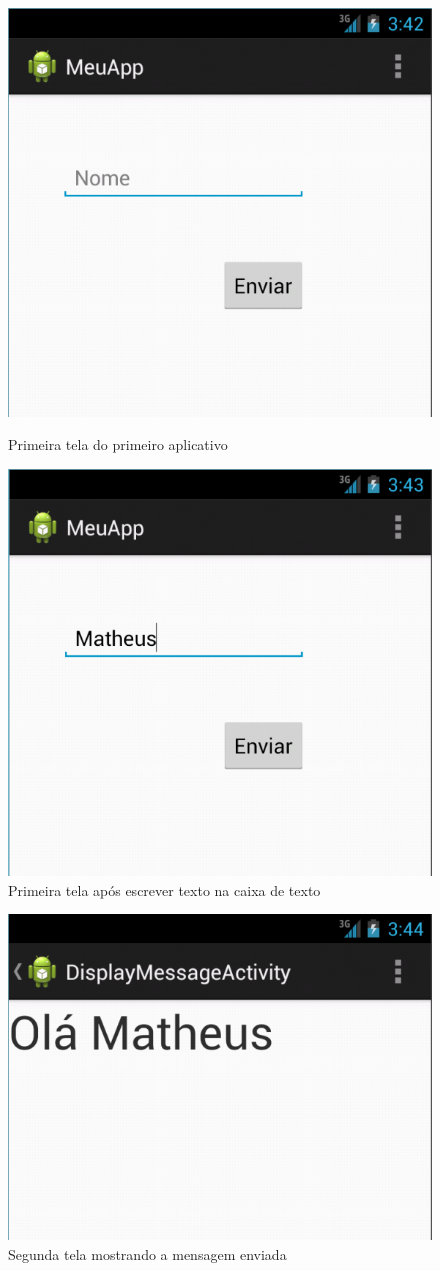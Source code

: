 \documentclass[a4paper,12pt,brazil,doubleside]{book}
\begin{document}
\begin{singlespace}
\begin{figure}[H]
  \centering
  \includegraphics[width=.4\textwidth]{figuras/6-criando-app.png}
  \caption{Primeira tela do primeiro aplicativo}
  \label{fig:f}
  \includegraphics[width=.4\textwidth]{figuras/7-criando-app.png}
  \caption{Primeira tela após escrever texto na caixa de texto}
  \label{fig:g}
\end{figure}
\begin{figure}[H]
  \centering
  \includegraphics[width=.4	\textwidth]{figuras/8-criando-app.png}
  \caption{Segunda tela mostrando a mensagem enviada}
  \label{fig:h}
\end{figure}


\end{singlespace}

\begin{singlespace}

%

\end{singlespace}
\end{document}
